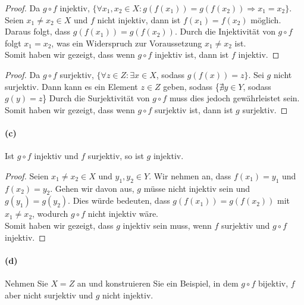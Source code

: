 \documentclass[12pt, letterpaper]{article}
\begin{document}
\begin{proof}

\noindent Da $g \circ f$ injektiv, $\{\forall x_1, x_2 \in X: g(f(x_1)) = g(f(x_2)) \Rightarrow x_1 = x_2\}$. Seien $x_1 \neq x_2 \in X$ und $f$ nicht injektiv, dann ist $f(x_1) = f(x_2)$ möglich.
Daraus folgt, dass $g(f(x_1)) = g(f(x_2))$. Durch die Injektivität von $g \circ f$ folgt $x_1 = x_2$, was ein Widerspruch zur Voraussetzung $x_1 \neq x_2$ ist.\\

\noindent Somit haben wir gezeigt, dass wenn $g \circ f$ injektiv ist, dann ist $f$ injektiv.

\end{proof}

\begin{proof}

\noindent Da $g \circ f$ surjektiv, $\{\forall z \in Z: \exists x \in X$, sodass $g(f(x)) = z\}$. Sei $g$ nicht surjektiv. Dann kann es ein Element $z \in Z$ geben, sodass \{$\nexists y \in Y$, sodass $g(y) = z$\} Durch die Surjektivität von $g \circ f$ muss dies jedoch gewährleistet sein.\\

\noindent Somit haben wir gezeigt, dass wenn $g \circ f$ surjektiv ist, dann ist $g$ surjektiv.

\end{proof}

\paragraph{(c)} Ist $g \circ f$ injektiv und $f$ surjektiv, so ist $g$ injektiv.\\

\begin{proof}

\noindent Seien $x_1 \neq x_2 \in X$ und $y_1, y_2 \in Y$. Wir nehmen an, dass $f(x_1) = y_1$ und $f(x_2) = y_2$. Gehen wir davon aus, $g$ müsse nicht injektiv sein und $g(y_1) = g(y_2)$.
Dies würde bedeuten, dass $g(f(x_1)) = g(f(x_2))$ mit $x_1 \neq x_2$, wodurch $g \circ f$ nicht injektiv wäre.\\

\noindent Somit haben wir gezeigt, dass $g$ injektiv sein muss, wenn $f$ surjektiv und $g \circ f$ injektiv.

\end{proof}

\paragraph{(d)} Nehmen Sie $X = Z$ an und konstruieren Sie ein Beispiel, in dem $g \circ f$ bijektiv, $f$ aber nicht surjektiv und $g$ nicht injektiv.\\
\end{document}
